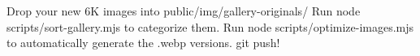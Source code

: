 Drop your new 6K images into public/img/gallery-originals/
Run node scripts/sort-gallery.mjs to categorize them.
Run node scripts/optimize-images.mjs to automatically generate the .webp versions.
git push!
